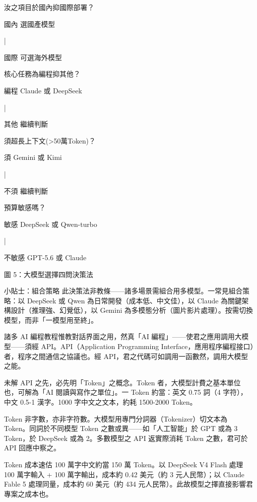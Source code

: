 汝之項目於國內抑國際部署？

國內 選國產模型

|

國際 可選海外模型

核心任務為編程抑其他？

編程 Claude 或 DeepSeek

|

其他 繼續判斷

須超長上下文(>50萬Token)？

須 Gemini 或 Kimi

|

不須 繼續判斷

預算敏感嗎？

敏感 DeepSeek 或 Qwen-turbo

|

不敏感 GPT-5.6 或 Claude

\begin{center}\small\color{gray}圖 5：大模型選擇四問決策法\end{center}

\begin{tcbinfo}{小貼士：組合策略}
此決策法非教條——諸多場景需組合用多模型。一常見組合策略：以 DeepSeek 或 Qwen 為日常開發（成本低、中文佳），以 Claude 為關鍵架構設計（推理強、幻覺低），以 Gemini 為多模態分析（圖片影片處理）。按需切換模型，而非「一模型用至終」。

\end{tcbinfo}


諸多 AI 編程教程惟教對話界面之用，然真「AI 編程」——使君之應用調用大模型——須經 API。API（Application Programming Interface，應用程序編程接口）者，程序之間通信之協議也。經 API，君之代碼可如調用一函數然，調用大模型之能。


未解 API 之先，必先明「Token」之概念。Token 者，大模型計費之基本單位也，可解為「AI 閱讀與寫作之單位」。一 Token 約當：英文 0.75 詞（4 字符），中文 0.5-1 漢字。1000 字中文之文本，約耗 1500-2000 Token。

Token 非字數，亦非字符數。大模型用專門分詞器（Tokenizer）切文本為 Token。同詞於不同模型 Token 之數或異——如「人工智能」於 GPT 或為 3 Token，於 DeepSeek 或為 2。多數模型之 API 返實際消耗 Token 之數，君可於 API 回應中察之。

\begin{tcbinfo}{Token 成本速估}
100 萬字中文約當 150 萬 Token。以 DeepSeek V4 Flash 處理 100 萬字輸入 + 100 萬字輸出，成本約 0.42 美元（約 3 元人民幣）；以 Claude Fable 5 處理同量，成本約 60 美元（約 434 元人民幣）。此故模型之擇直接影響君專案之成本也。

\end{tcbinfo}

